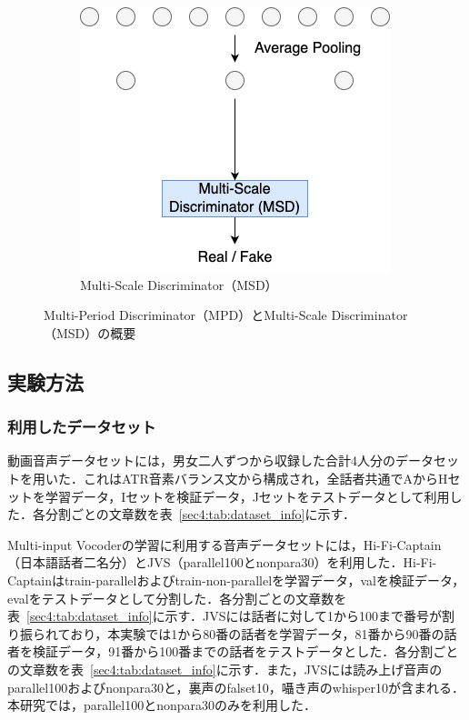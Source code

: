 \documentclass[12pt]{jarticle}
\numberwithin{equation}{section}    %
\numberwithin{figure}{section}      %
\numberwithin{table}{section}      %
\begin{document}
\begin{figure}[bt]
\begin{subfigure}{0.45\textwidth}
        \includegraphics[width=\linewidth]{./figure/sec4/model/msd.png}
        \caption{Multi-Scale Discriminator（MSD）}
        \label{sec4:fig:multi-input_vocoder_msd}
    \end{subfigure}
    \caption{Multi-Period Discriminator（MPD）とMulti-Scale Discriminator（MSD）の概要}
    \label{sec4:fig:multi-input_vocoder_mpd_msd}
\end{figure}

\subsection{実験方法}
\subsubsection{利用したデータセット}
動画音声データセットには，男女二人ずつから収録した合計4人分のデータセット\cite{taguchi,esaki}を用いた．これはATR音素バランス文\cite{atr}から構成され，全話者共通でAからHセットを学習データ，Iセットを検証データ，Jセットをテストデータとして利用した．各分割ごとの文章数を表~\ref{sec4:tab:dataset_info}に示す．

Multi-input Vocoderの学習に利用する音声データセットには，Hi-Fi-Captain（日本語話者二名分）\cite{okamoto2023hi}とJVS（parallel100とnonpara30）\cite{takamichi2019jvs}を利用した．Hi-Fi-Captainはtrain-parallelおよびtrain-non-parallelを学習データ，valを検証データ，evalをテストデータとして分割した．各分割ごとの文章数を表~\ref{sec4:tab:dataset_info}に示す．JVSには話者に対して1から100まで番号が割り振られており，本実験では1から80番の話者を学習データ，81番から90番の話者を検証データ，91番から100番までの話者をテストデータとした．各分割ごとの文章数を表~\ref{sec4:tab:dataset_info}に示す．また，JVSには読み上げ音声のparallel100およびnonpara30と，裏声のfalset10，囁き声のwhisper10が含まれる．本研究では，parallel100とnonpara30のみを利用した．
\end{document}
